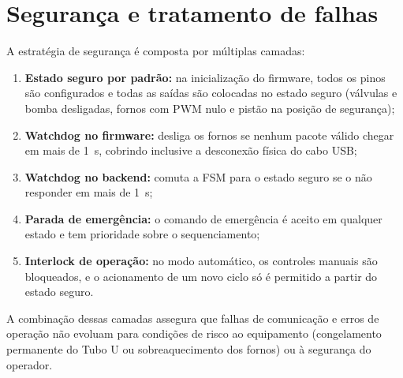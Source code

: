 \section{Seguran\c{c}a e tratamento de falhas}

A estrat\'egia de seguran\c{c}a \'e composta por m\'ultiplas camadas:

\begin{enumerate}[label=\arabic*)]
  \item \textbf{Estado seguro por padr\~ao:} na inicializa\c{c}\~ao do firmware,
  todos os pinos s\~ao configurados e todas as sa\'idas s\~ao colocadas no estado
  seguro (v\'alvulas e bomba desligadas, fornos com PWM nulo e pist\~ao na
  posi\c{c}\~ao de seguran\c{c}a);
  \item \textbf{Watchdog no firmware:} desliga os fornos se nenhum pacote v\'alido
  chegar em mais de 1~s, cobrindo inclusive a desconex\~ao f\'isica do cabo USB;
  \item \textbf{Watchdog no backend:} comuta a FSM para o estado seguro se o
  \daq n\~ao responder em mais de 1~s;
  \item \textbf{Parada de emerg\^encia:} o comando de emerg\^encia \'e aceito em
  qualquer estado e tem prioridade sobre o sequenciamento;
  \item \textbf{Interlock de opera\c{c}\~ao:} no modo autom\'atico, os controles
  manuais s\~ao bloqueados, e o acionamento de um novo ciclo s\'o \'e permitido a
  partir do estado seguro.
\end{enumerate}

A combina\c{c}\~ao dessas camadas assegura que falhas de comunica\c{c}\~ao e
erros de opera\c{c}\~ao n\~ao evoluam para condi\c{c}\~oes de risco ao
equipamento (congelamento permanente do Tubo U ou sobreaquecimento dos fornos)
ou \`a seguran\c{c}a do operador.

